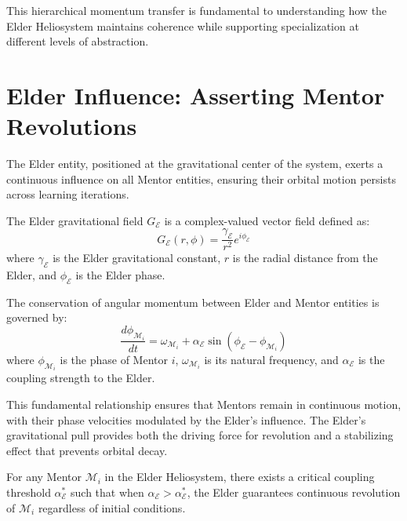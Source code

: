 This hierarchical momentum transfer is fundamental to understanding how the Elder Heliosystem maintains coherence while supporting specialization at different levels of abstraction.

\section{Elder Influence: Asserting Mentor Revolutions}

The Elder entity, positioned at the gravitational center of the system, exerts a continuous influence on all Mentor entities, ensuring their orbital motion persists across learning iterations.

\begin{definition}
The Elder gravitational field $G_{\mathcal{E}}$ is a complex-valued vector field defined as:
\begin{equation}
G_{\mathcal{E}}(r, \phi) = \frac{\gamma_{\mathcal{E}}}{r^2}e^{i\phi_{\mathcal{E}}}
\end{equation}
where $\gamma_{\mathcal{E}}$ is the Elder gravitational constant, $r$ is the radial distance from the Elder, and $\phi_{\mathcal{E}}$ is the Elder phase.
\end{definition}

\begin{proposition}
The conservation of angular momentum between Elder and Mentor entities is governed by:
\begin{equation}
\frac{d\phi_{\mathcal{M}_i}}{dt} = \omega_{\mathcal{M}_i} + \alpha_{\mathcal{E}} \sin(\phi_{\mathcal{E}} - \phi_{\mathcal{M}_i})
\end{equation}
where $\phi_{\mathcal{M}_i}$ is the phase of Mentor $i$, $\omega_{\mathcal{M}_i}$ is its natural frequency, and $\alpha_{\mathcal{E}}$ is the coupling strength to the Elder.
\end{proposition}

This fundamental relationship ensures that Mentors remain in continuous motion, with their phase velocities modulated by the Elder's influence. The Elder's gravitational pull provides both the driving force for revolution and a stabilizing effect that prevents orbital decay.

\begin{theorem}
For any Mentor $\mathcal{M}_i$ in the Elder Heliosystem, there exists a critical coupling threshold $\alpha_{\mathcal{E}}^*$ such that when $\alpha_{\mathcal{E}} > \alpha_{\mathcal{E}}^*$, the Elder guarantees continuous revolution of $\mathcal{M}_i$ regardless of initial conditions.
\end{theorem}


